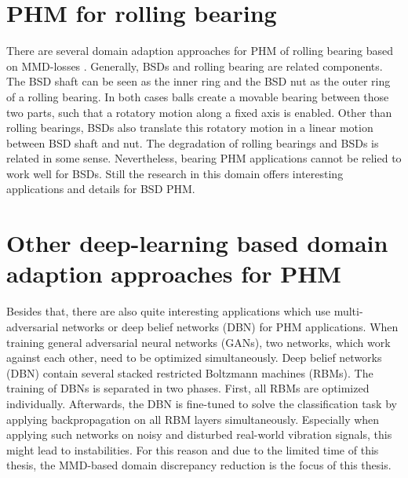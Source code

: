 \begin{comment}
Both Pandhare et al \cite{Pandhare2021} and Azamfar et al \cite{AZAMFAR2020103932} feed the data recorded during BSD steady-state motion as one single input to their models. During the phases of constant BSD motion, the amplitude of the signals changess. Azamfar et al assume that the shorter sequences created by a windowing function just capture limited information about these changes and are therefore not a proper tool for PHM \cite{AZAMFAR2020103932}. In the thesis a windowing function was evaluated for the PHM of BSDs. Windowing functions make the BSD experiments less dependent from specific BSD excitements. When beeing able to check the BSD degradation with short recorded windows, one can make statements about the BSD health status with data redcorded in real time use. Extra experiments 
\end{comment}

\section{PHM for rolling bearing}
There are several domain adaption approaches for PHM of rolling bearing based on MMD-losses \cite{Guo2019} \cite{Singh2019} \cite{Li2018} \cite{AN201942} \cite{Kang2020}. Generally, BSDs and rolling bearing are related components. The BSD shaft can be seen as the inner ring and the BSD nut as the outer ring of a rolling bearing. In both cases balls create a movable bearing between those two parts, such that a rotatory motion along a fixed axis is enabled. Other than rolling bearings, BSDs also translate this rotatory motion in a linear motion between BSD shaft and nut. The degradation of rolling bearings and BSDs is related in some sense. Nevertheless, bearing PHM applications cannot be relied to work well for BSDs. Still the research in this domain offers interesting applications and details for BSD PHM. 

\section{Other deep-learning based domain adaption approaches for PHM}
Besides that, there are also quite interesting applications which use multi-adversarial networks \cite{Zhang2019} or deep belief networks (DBN) \cite{ZHAO2019213} for PHM applications. When training general adversarial neural networks (GANs), two networks, which work against each other, need to be optimized simultaneously. Deep belief networks (DBN) contain several stacked restricted Boltzmann machines (RBMs). The training of DBNs is separated in two phases. First, all RBMs are optimized individually. Afterwards, the DBN is fine-tuned to solve the classification task by applying backpropagation on all RBM layers simultaneously. Especially when applying such networks on noisy and disturbed real-world vibration signals, this might lead to instabilities. For this reason and due to the limited time of this thesis, the MMD-based domain discrepancy reduction is the focus of this thesis.
